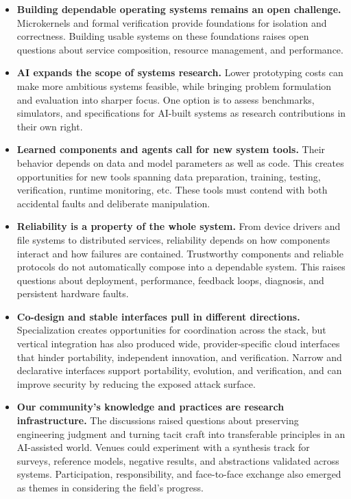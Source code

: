 \documentclass[manuscript]{acmart}
\begin{document}
\begin{itemize}
\item \textbf{Building dependable operating systems remains an open challenge.}
Microkernels and formal verification provide foundations for isolation and correctness.
Building usable systems on these foundations raises open questions about service composition, resource management, and performance.

\item \textbf{AI expands the scope of systems research.}
Lower prototyping costs can make more ambitious systems feasible, while bringing problem formulation and evaluation into sharper focus.
One option is to assess benchmarks, simulators, and specifications for AI-built systems as research contributions in their own right.

\item \textbf{Learned components and agents call for new system tools.}
Their behavior depends on data and model parameters as well as code.
This creates opportunities for new tools spanning data preparation, training, testing, verification, runtime monitoring, etc.
These tools must contend with both accidental faults and deliberate manipulation.

\item \textbf{Reliability is a property of the whole system.}
From device drivers and file systems to distributed services, reliability depends on how components interact and how failures are contained.
Trustworthy components and reliable protocols do not automatically compose into a dependable system.
This raises questions about deployment, performance, feedback loops, diagnosis, and persistent hardware faults.

\item \textbf{Co-design and stable interfaces pull in different directions.}
Specialization creates opportunities for coordination across the stack, but vertical integration has also produced wide, provider-specific cloud interfaces that hinder portability, independent innovation, and verification.
Narrow and declarative interfaces support portability, evolution, and verification, and can improve security by reducing the exposed attack surface.

\item \textbf{Our community's knowledge and practices are research infrastructure.}
The discussions raised questions about preserving engineering judgment and turning tacit craft into transferable principles in an AI-assisted world.
Venues could experiment with a synthesis track for surveys, reference models, negative results, and abstractions validated across systems.
Participation, responsibility, and face-to-face exchange also emerged as themes in considering the field's progress.
\end{itemize}
\end{document}
